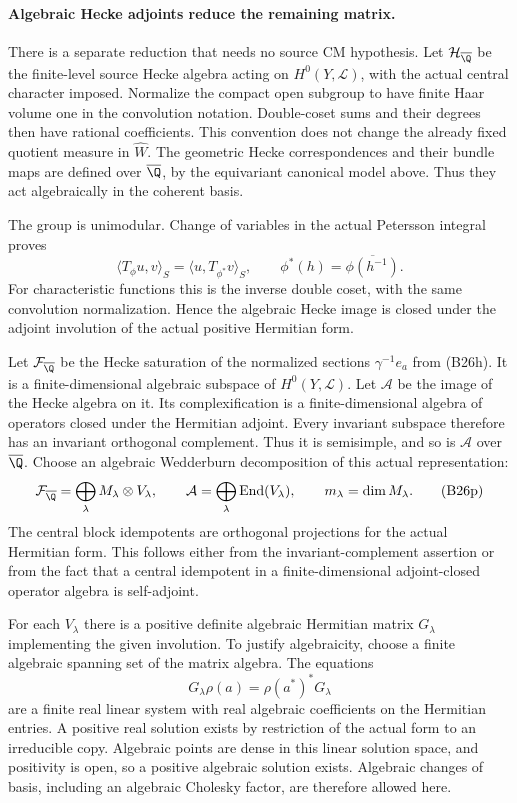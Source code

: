 \paragraph{Algebraic Hecke adjoints reduce the remaining matrix.}
There is a separate reduction that needs no source CM
hypothesis.  Let $\mathcal H_{\overline\Q}$ be the finite-level
source Hecke algebra acting on $H^0(Y,\mathscr L)$, with the
actual central character imposed.  Normalize the compact
open subgroup to have finite Haar volume one in the
convolution notation.  Double-coset sums and their degrees
then have rational coefficients.  This convention does not
change the already fixed quotient measure in $\widehat W$.
The geometric Hecke correspondences and their bundle maps
are defined over $\overline\Q$, by the equivariant canonical
model above.  Thus they act algebraically in the coherent
basis.

The group is unimodular.  Change of variables in the
actual Petersson integral proves
\[
    \langle T_\phi u,v\rangle_S
        =\langle u,T_{\phi^*}v\rangle_S,
       \qquad \phi^*(h)=\overline{\phi(h^{-1})}.
 \tag{B26o}
\]
For characteristic functions this is the inverse double
coset, with the same convolution normalization.  Hence
the algebraic Hecke image is closed under the adjoint
involution of the actual positive Hermitian form.

Let $\mathcal F_{\overline\Q}$ be the Hecke saturation of
the normalized sections $\gamma^{-1}e_a$ from (B26h).
It is a finite-dimensional algebraic subspace of
$H^0(Y,\mathscr L)$.  Let $\mathcal A$ be the image of the
Hecke algebra on it.  Its complexification is a finite-dimensional
algebra of operators closed under the Hermitian adjoint.
Every invariant subspace therefore has an invariant
orthogonal complement.  Thus it is semisimple, and so is
$\mathcal A$ over $\overline\Q$.  Choose an algebraic
Wedderburn decomposition of this actual representation:
\[
 \mathcal F_{\overline\Q}
    =\bigoplus_\lambda M_\lambda\otimes V_\lambda,
 \qquad
 \mathcal A=\bigoplus_\lambda\operatorname{End}(V_\lambda),
 \qquad m_\lambda=\dim M_\lambda.
 \tag{B26p}
\]
The central block idempotents are orthogonal projections
for the actual Hermitian form.  This follows either from
the invariant-complement assertion or from the fact that
a central idempotent in a finite-dimensional adjoint-closed
operator algebra is self-adjoint.

For each $V_\lambda$ there is a positive definite algebraic
Hermitian matrix $G_\lambda$ implementing the given
involution.  To justify algebraicity, choose a finite
algebraic spanning set of the matrix algebra.  The equations
\[
        G_\lambda\rho(a)=\rho(a^*)^*G_\lambda
 \tag{B26q}
\]
are a finite real linear system with real algebraic
coefficients on the Hermitian entries.  A positive real
solution exists by restriction of the actual form to an
irreducible copy.  Algebraic points are dense in this
linear solution space, and positivity is open, so a
positive algebraic solution exists.  Algebraic changes
of basis, including an algebraic Cholesky factor, are
therefore allowed here.

